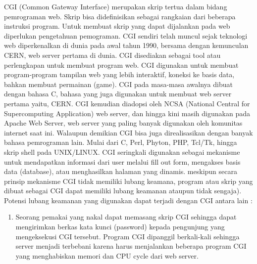	CGI (Common Gateway Interface) merupakan skrip tertua dalam bidang pemrograman web. Skrip bisa didefinisikan sebagai rangkaian dari beberapa instruksi program. Untuk membuat skrip yang dapat dijalankan pada web diperlukan pengetahuan pemograman. 
	CGI sendiri telah muncul sejak teknologi web diperkenalkan di dunia pada awal tahun 1990, bersama dengan kemunculan CERN, web server pertama di dunia. CGI disediakan sebagai tool atau perlengkapan untuk membuat program web. CGI digunakan untuk membuat program-program tampilan web yang lebih interaktif, koneksi ke basis data, bahkan membuat permainan (game). 
	CGI pada masa-masa awalnya dibuat dengan bahasa C, bahasa yang juga digunakan untuk membuat web server pertama yaitu, CERN. CGI kemudian diadopsi oleh NCSA (National Central for Supercomputing Application) web server, dan hingga kini masih digunakan pada Apache Web Server, web server yang paling banyak digunakan oleh komunitas internet saat ini.
	Walaupun demikian CGI bisa juga direalisasikan dengan banyak bahasa pemrograman lain. Mulai dari C, Perl, Phyton, PHP, Tcl/Tk, hingga skrip shell pada UNIX/LINUX. 
	CGI seringkali digunakan sebagai mekanisme untuk mendapatkan informasi dari user melalui fill out form, mengakses basis data (database), atau menghasilkan halaman yang dinamis. meskipun secara prinsip mekanisme CGI tidak memiliki lubang keamana, program atau skrip yang dibuat sebagai CGI dapat memiliki lubang keamanan ataupun tidak sengaja). Potensi lubang keamanan yang digunakan dapat terjadi dengan CGI antara lain : 
\begin{enumerate}
\item Seorang pemakai yang nakal dapat memasang skrip CGI sehingga dapat mengirimkan berkas kata kunci (password) kepada pengunjung yang mengeksekusi CGI tersebut. 
\tem Program CGI dipanggil berkali-kali sehingga server menjadi terbebani karena harus menjalankan beberapa program CGI yang menghabiskan memori dan CPU cycle dari web server.
	\end{enumerate}
